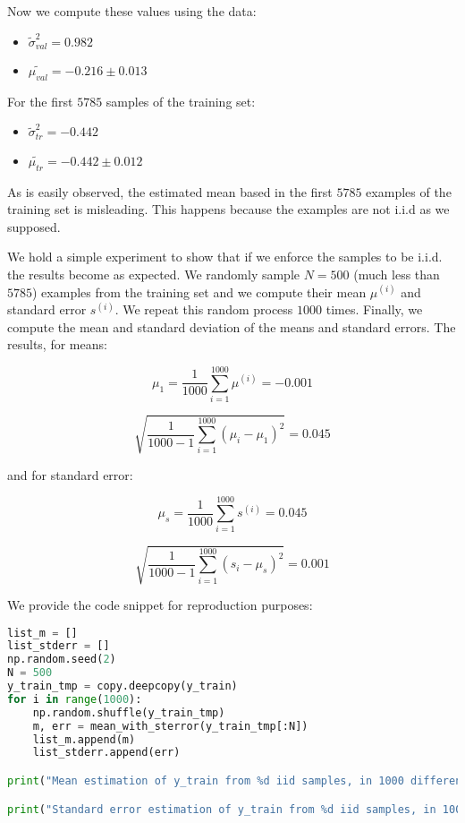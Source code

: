 \documentclass{article}
\begin{document}
Now we compute these values using the data:
\begin{itemize}
    \item $ \tilde{\sigma}_{val}^2 = 0.982 $
    \item $ \tilde{\mu_{val}} = - 0.216 \pm 0.013 $
\end{itemize}

For the first $5785$ samples of the training set:
\begin{itemize}
    \item $ \tilde{\sigma}_{tr}^2 = -0.442 $
    \item $ \tilde{\mu_{tr}} = - 0.442 \pm 0.012 $
\end{itemize}

As is easily observed, the estimated mean based in the first $5785$ examples of the training set is misleading. This happens because the examples are not i.i.d as we supposed.

We hold a simple experiment to show that if we enforce the samples to be i.i.d. the results become as expected. We randomly sample $N = 500$ (much less than $5785$) examples from the training set and we compute their mean $\mu^{(i)}$ and standard error $s^{(i)}$. We repeat this random process $1000$ times. Finally, we compute the mean and standard deviation of the means and standard errors. The results, for means:

$$ \displaystyle  \mu_1 = \frac{1}{1000} \sum_{i=1}^{1000} \mu^{(i)} = -0.001 $$

$$ \displaystyle \sqrt{  \frac{1}{1000 - 1} \sum_{i=1}^{1000} (\mu_i - \mu_1)^2} = 0.045 $$

and for standard error:

$$ \displaystyle  \mu_{s} = \frac{1}{1000} \sum_{i=1}^{1000} s^{(i)} = 0.045 $$

$$ \displaystyle \sqrt{  \frac{1}{1000 - 1} \sum_{i=1}^{1000} (s_i - \mu_{s})^2} = 0.001 $$

We provide the code snippet for reproduction purposes:

\begin{lstlisting}[language = Python]
list_m = []
list_stderr = []
np.random.seed(2)
N = 500
y_train_tmp = copy.deepcopy(y_train)
for i in range(1000):
    np.random.shuffle(y_train_tmp)
    m, err = mean_with_sterror(y_train_tmp[:N])
    list_m.append(m)
    list_stderr.append(err)

print("Mean estimation of y_train from %d iid samples, in 1000 different executions has mean: %.3f and standard deviation: %.3f" %(N, np.mean(list_m), np.std(list_m, ddof=1)))

print("Standard error estimation of y_train from %d iid samples, in 1000 different executions has mean: %.3f and standard deviation: %.3f" %(N, np.mean(list_stderr), np.std(list_stderr, ddof = 1)))
\end{lstlisting}
\end{document}
